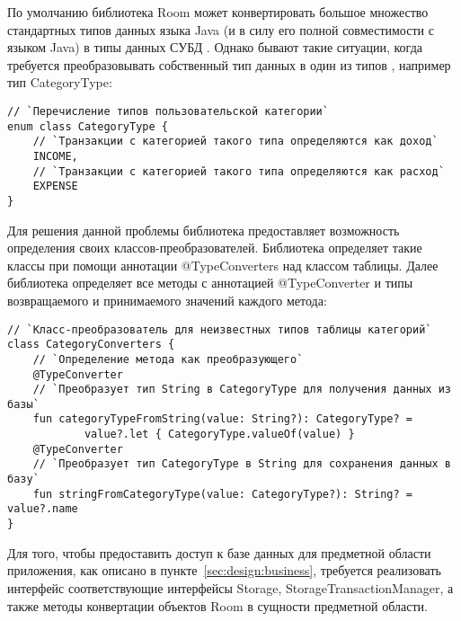 По умолчанию библиотека Room может конвертировать большое множество стандартных типов данных языка Java (и \kt в силу его полной совместимости с языком Java) в типы данных СУБД \sqlite.
Однако бывают такие ситуации, когда требуется преобразовывать собственный тип данных в один из типов \sqlite, например тип CategoryType:
\begin{lstlisting}[style=standard]
// `Перечисление типов пользовательской категории`
enum class CategoryType {
    // `Транзакции с категорией такого типа определяются как доход`
    INCOME,
    // `Транзакции с категорией такого типа определяются как расход`
    EXPENSE
}
\end{lstlisting}

Для решения данной проблемы библиотека предоставляет возможность определения своих классов-преобразователей.
Библиотека определяет такие классы при помощи аннотации @TypeConverters над классом таблицы.
Далее библиотека определяет все методы с аннотацией @TypeConverter и типы возвращаемого и принимаемого значений каждого метода:
\begin{lstlisting}[style=standard]
// `Класс-преобразователь для неизвестных типов таблицы категорий`
class CategoryConverters {
    // `Определение метода как преобразующего`
    @TypeConverter
    // `Преобразует тип String в CategoryType для получения данных из базы`
    fun categoryTypeFromString(value: String?): CategoryType? =
            value?.let { CategoryType.valueOf(value) }
    @TypeConverter
    // `Преобразует тип CategoryType в String для сохранения данных в базу`
    fun stringFromCategoryType(value: CategoryType?): String? = value?.name
}
\end{lstlisting}

Для того, чтобы предоставить доступ к базе данных для предметной области приложения, как описано в пункте~\ref{sec:design:business}, требуется реализовать интерфейс соответствующие интерфейсы Storage, StorageTransactionManager, а также методы конвертации объектов Room в сущности предметной области.